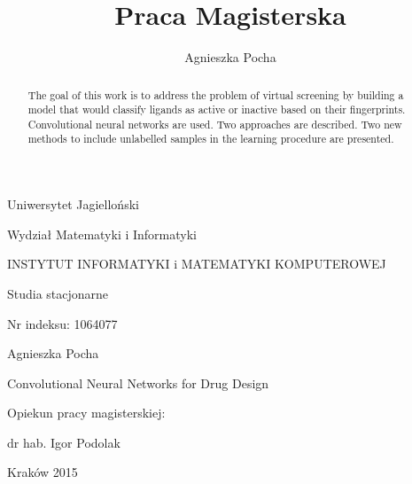 \documentclass[a4paper,10pt]{report}
\title{Praca Magisterska}
\author{Agnieszka Pocha}
\newenvironment{bottompar}{\par\vspace*{\fill}}{\clearpage}
\begin{document}
  \begin{center}
    Uniwersytet Jagielloński
    
    Wydział Matematyki i Informatyki
    
    INSTYTUT INFORMATYKI i MATEMATYKI KOMPUTEROWEJ
    
    Studia stacjonarne 
  \end{center}
  Nr indeksu: 1064077  
  
  \begin{center}
   Agnieszka Pocha 
   
   \large Convolutional Neural Networks for Drug Design 
  \end{center}
  \begin{flushright}
    Opiekun pracy magisterskiej:
    
    dr hab. Igor Podolak 
  \end{flushright}

  \begin{bottompar}
  \begin{center}
   \large Kraków 2015
  \end{center}
  \end{bottompar}

  
  \begin{abstract}
    The goal of this work is to address the problem of virtual screening by building a model that would classify ligands as active or inactive based on their fingerprints. Convolutional neural networks are used. Two approaches are described. Two new methods to include unlabelled samples in the learning procedure are presented.
  \end{abstract}
  
  \tableofcontents\vfill\eject
    
  
\end{document}
